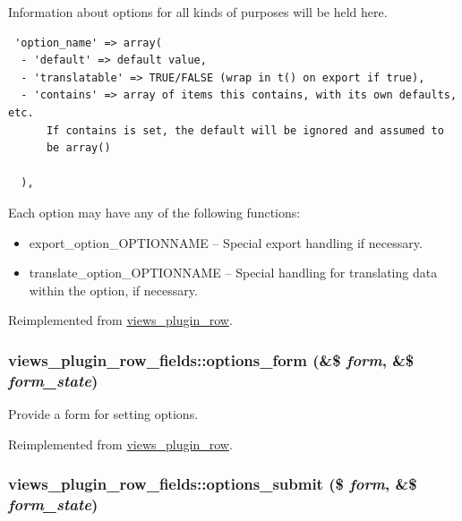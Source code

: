 Information about options for all kinds of purposes will be held here. 

\begin{Code}\begin{verbatim} 'option_name' => array(
  - 'default' => default value,
  - 'translatable' => TRUE/FALSE (wrap in t() on export if true),
  - 'contains' => array of items this contains, with its own defaults, etc.
      If contains is set, the default will be ignored and assumed to
      be array()

  ),
\end{verbatim}
\end{Code}

 Each option may have any of the following functions:\begin{itemize}
\item export\_\-option\_\-OPTIONNAME -- Special export handling if necessary.\item translate\_\-option\_\-OPTIONNAME -- Special handling for translating data within the option, if necessary. \end{itemize}


Reimplemented from \hyperlink{classviews__plugin__row_ad6be1492eae8605e9aff37da9f19337}{views\_\-plugin\_\-row}.\hypertarget{classviews__plugin__row__fields_bb87b6c98697fb676638759cb95072e3}{
\subsubsection[{options\_\-form}]{\setlength{\rightskip}{0pt plus 5cm}views\_\-plugin\_\-row\_\-fields::options\_\-form (\&\$ {\em form}, \/  \&\$ {\em form\_\-state})}}
\label{classviews__plugin__row__fields_bb87b6c98697fb676638759cb95072e3}


Provide a form for setting options. 

Reimplemented from \hyperlink{classviews__plugin__row_6914c39d64977a0aa71da39cc1af004e}{views\_\-plugin\_\-row}.\hypertarget{classviews__plugin__row__fields_25748927a3375430946259f22c841620}{
\subsubsection[{options\_\-submit}]{\setlength{\rightskip}{0pt plus 5cm}views\_\-plugin\_\-row\_\-fields::options\_\-submit (\$ {\em form}, \/  \&\$ {\em form\_\-state})}}
\label{classviews__plugin__row__fields_25748927a3375430946259f22c841620}


